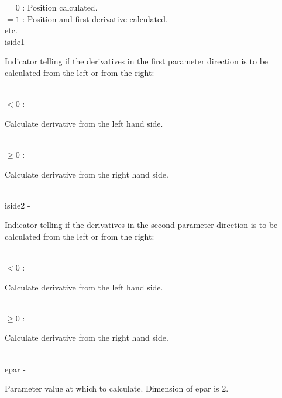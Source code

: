                      \>\>\>\> $=0$ \> : Position calculated.\\
                     \>\>\>\> $=1$ \> : Position and first derivative calculated.\\
                     \>\>\>\>      \>   etc.\\
        \>\>    {\fov iside1}\> - \>  \begin{minipg2}
                        Indicator telling if the derivatives in the first
                        parameter direction is to be calculated from the
                        left or from the right:
                      \end{minipg2}\\[0.3ex]
                      \>\>\>\> $<0$ \> :
                      \begin{minipg5}
                        Calculate derivative from the left hand side.
                      \end{minipg5}\\[0.8ex]
                      \>\>\>\> $\geq 0$ \> :
                      \begin{minipg5}
                        Calculate derivative from the right hand side.
                      \end{minipg5}\\[0.8ex]
        \>\>    {\fov iside2}\> - \>  \begin{minipg2}
                     Indicator telling if the derivatives in the second
                        parameter direction is to be calculated from the
                        left or from the right:
                               \end{minipg2}\\[0.3ex]
                      \>\>\>\> $<0$ \> :
                      \begin{minipg5}
                        Calculate derivative from the left hand side.
                      \end{minipg5}\\[0.8ex]
                      \>\>\>\> $\geq 0$ \> :
                      \begin{minipg5}
                        Calculate derivative from the right hand side.
                      \end{minipg5}\\[0.8ex]
        \>\>    {\fov epar}\> - \>  \begin{minipg2}
                    Parameter value at which to calculate. Dimension
                       of {\fov epar} is 2.
                               \end{minipg2}\\[0.8ex]
